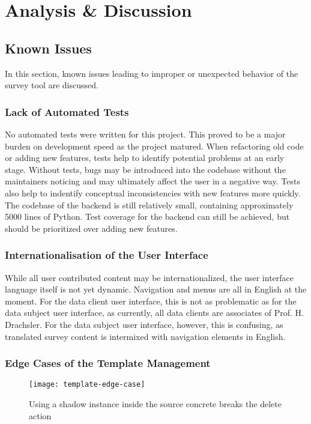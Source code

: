 \section{Analysis \& Discussion}

    \subsection{Known Issues}
    	In this section, known issues leading to improper or unexpected
    	behavior of the survey tool are discussed.

    	\subsubsection{Lack of Automated Tests}
    		No automated tests were written for this project. This proved
    		to be a major burden on development speed as the project
    		matured. When refactoring old code or adding new features,
    		tests help to identify potential problems at an early stage.
    		Without tests, bugs may be introduced into the codebase
    		without the maintainers noticing and may ultimately
    		affect the user in a negative way. Tests also
    		help to indentify conceptual inconsistencies
    		with new features more quickly. The codebase of the
    		backend is still relatively small, containing
    		approximately 5000 lines of Python. Test coverage for
    		the backend can still be achieved, but should be prioritized
    		over adding new features.

    	\subsubsection{Internationalisation of the User Interface}
    		While all user contributed content may be internationalized,
    		the user interface language itself is not yet dynamic.
    		Navigation and menus are all in English at the moment.
    		For the data client user interface, this is not as
    		problematic as for the data subject user interface, as 
    		currently, all data clients are associates of Prof. H. Drachsler.
    		For the data subject user interface, however, this is confusing,
    		as translated survey content is intermixed with
    		navigation elements in English.

    	\subsubsection{Edge Cases of the Template Management}
    		\begin{wrapfigure}{o}{0.5\textwidth}
    			\centering
    			\texttt{[image: template-edge-case]}
    			\caption{Using a shadow instance inside the source concrete breaks the delete action}
    			\label{fig:shadow-breaks-delete}
    		\end{wrapfigure}

